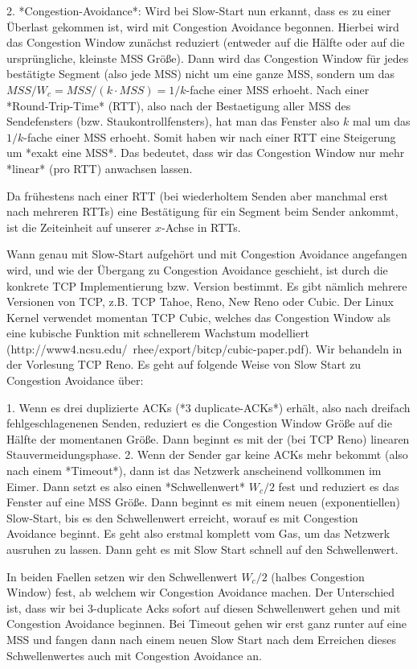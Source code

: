 2. *Congestion-Avoidance*: Wird bei Slow-Start nun erkannt, dass es zu einer
   Überlast gekommen ist, wird mit Congestion Avoidance begonnen. Hierbei wird
   das Congestion Window zunächst reduziert (entweder auf die Hälfte oder auf
   die ursprüngliche, kleinste MSS Größe). Dann wird das Congestion Window für
   jedes bestätigte Segment (also jede MSS) nicht um eine ganze MSS, sondern um
   das $MSS/W_c = MSS/(k \cdot MSS) = 1/k$-fache einer MSS erhoeht. Nach einer
   *Round-Trip-Time* (RTT), also nach der Bestaetigung aller MSS des
   Sendefensters (bzw. Staukontrollfensters), hat man das Fenster also $k$ mal
   um das $1/k$-fache einer MSS erhoeht. Somit haben wir nach einer RTT eine
   Steigerung um *exakt eine MSS*. Das bedeutet, dass wir das Congestion Window
   nur mehr *linear* (pro RTT) anwachsen lassen.

Da frühestens nach einer RTT (bei wiederholtem Senden aber manchmal erst nach
mehreren RTTs) eine Bestätigung für ein Segment beim Sender ankommt, ist die
Zeiteinheit auf unserer $x$-Achse in RTTs.

Wann genau mit Slow-Start aufgehört und mit Congestion Avoidance angefangen
wird, und wie der Übergang zu Congestion Avoidance geschieht, ist durch die
konkrete TCP Implementierung bzw. Version bestimmt. Es gibt nämlich mehrere
Versionen von TCP, z.B. TCP Tahoe, Reno, New Reno oder Cubic. Der Linux Kernel
verwendet momentan TCP Cubic, welches das Congestion Window als eine kubische
Funktion mit schnellerem Wachstum modelliert
(http://www4.ncsu.edu/~rhee/export/bitcp/cubic-paper.pdf). Wir behandeln in der
Vorlesung TCP Reno. Es geht auf folgende Weise von Slow Start zu Congestion
Avoidance über:

1. Wenn es drei duplizierte ACKs (*3 duplicate-ACKs*) erhält, also nach dreifach
   fehlgeschlagenenen Senden, reduziert es die Congestion Window Größe auf die
   Hälfte der momentanen Größe. Dann beginnt es mit der (bei TCP Reno) linearen
   Stauvermeidungsphase.
2. Wenn der Sender gar keine ACKs mehr bekommt (also nach einem *Timeout*), dann
   ist das Netzwerk anscheinend vollkommen im Eimer. Dann setzt es also einen
   *Schwellenwert* $W_c/2$ fest und reduziert es das Fenster auf eine MSS
   Größe. Dann beginnt es mit einem neuen (exponentiellen) Slow-Start, bis es
   den Schwellenwert erreicht, worauf es mit Congestion Avoidance beginnt. Es
   geht also erstmal komplett vom Gas, um das Netzwerk ausruhen zu lassen. Dann
   geht es mit Slow Start schnell auf den Schwellenwert.

In beiden Faellen setzen wir den Schwellenwert $W_c/2$ (halbes Congestion
Window) fest, ab welchem wir Congestion Avoidance machen. Der Unterschied ist,
dass wir bei 3-duplicate Acks sofort auf diesen Schwellenwert gehen und mit
Congestion Avoidance beginnen. Bei Timeout gehen wir erst ganz runter auf eine
MSS und fangen dann nach einem neuen Slow Start nach dem Erreichen dieses
Schwellenwertes auch mit Congestion Avoidance an.

